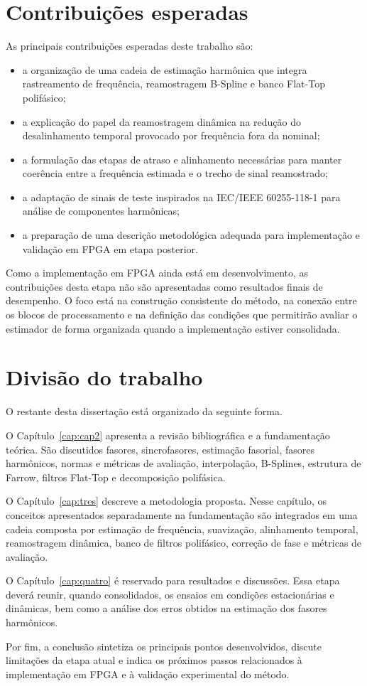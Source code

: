 \section{Contribuições esperadas}

As principais contribuições esperadas deste trabalho são:

\begin{itemize}
    \item a organização de uma cadeia de estimação harmônica que integra rastreamento de frequência, reamostragem B-Spline e banco Flat-Top polifásico;
    \item a explicação do papel da reamostragem dinâmica na redução do desalinhamento temporal provocado por frequência fora da nominal;
    \item a formulação das etapas de atraso e alinhamento necessárias para manter coerência entre a frequência estimada e o trecho de sinal reamostrado;
    \item a adaptação de sinais de teste inspirados na IEC/IEEE 60255-118-1 para análise de componentes harmônicas;
    \item a preparação de uma descrição metodológica adequada para implementação e validação em FPGA em etapa posterior.
\end{itemize}

Como a implementação em FPGA ainda está em desenvolvimento, as contribuições desta etapa não são apresentadas como resultados finais de desempenho. O foco está na construção consistente do método, na conexão entre os blocos de processamento e na definição das condições que permitirão avaliar o estimador de forma organizada quando a implementação estiver consolidada.

\section{Divisão do trabalho}

O restante desta dissertação está organizado da seguinte forma.

O Capítulo~\ref{cap:cap2} apresenta a revisão bibliográfica e a fundamentação teórica. São discutidos fasores, sincrofasores, estimação fasorial, fasores harmônicos, normas e métricas de avaliação, interpolação, B-Splines, estrutura de Farrow, filtros Flat-Top e decomposição polifásica.

O Capítulo~\ref{cap:tres} descreve a metodologia proposta. Nesse capítulo, os conceitos apresentados separadamente na fundamentação são integrados em uma cadeia composta por estimação de frequência, suavização, alinhamento temporal, reamostragem dinâmica, banco de filtros polifásico, correção de fase e métricas de avaliação.

O Capítulo~\ref{cap:quatro} é reservado para resultados e discussões. Essa etapa deverá reunir, quando consolidados, os ensaios em condições estacionárias e dinâmicas, bem como a análise dos erros obtidos na estimação dos fasores harmônicos.

Por fim, a conclusão sintetiza os principais pontos desenvolvidos, discute limitações da etapa atual e indica os próximos passos relacionados à implementação em FPGA e à validação experimental do método.
